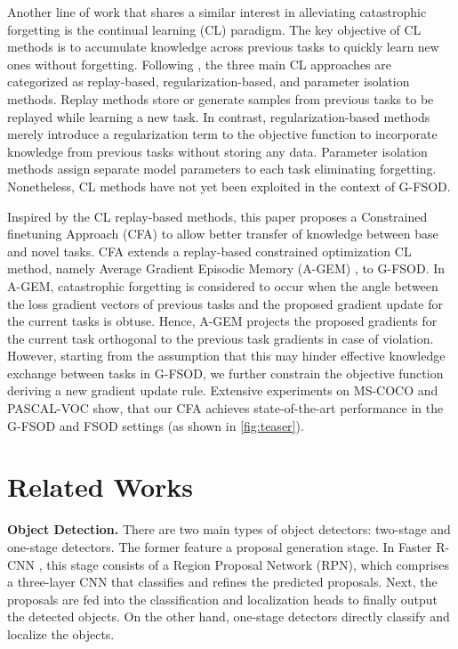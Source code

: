 \documentclass[10pt,twocolumn,letterpaper]{article}
\begin{document}
Another line of work that shares a similar interest in alleviating catastrophic forgetting is the continual learning (CL) paradigm.  The key objective of CL methods is to accumulate knowledge across previous tasks to quickly learn new ones without forgetting. Following \cite{cl_survey}, the three main CL approaches are categorized as replay-based, regularization-based, and parameter isolation methods. Replay methods \cite{iCarl, dgr, er, ser, tem, cope, pr, cclugm, lgm, gem, agem, MER, gss} store or generate samples from previous tasks to be replayed while learning a new task. In contrast, regularization-based methods \cite{ewc, lwf, si, lfl, ebll, dmc} merely introduce a regularization term to the objective function to incorporate knowledge from previous tasks without storing any data. Parameter isolation methods \cite{packnet, pnn, piggyback, hat, expert_gate, rcl, dan} assign separate model parameters to each task eliminating forgetting. Nonetheless, CL methods have not yet been exploited in the context of G-FSOD. 

Inspired by the CL replay-based methods, this paper proposes a Constrained finetuning Approach (CFA) to allow better transfer of knowledge between base and novel tasks. CFA extends a replay-based constrained optimization CL method, namely Average Gradient Episodic Memory (A-GEM) \cite{agem}, to G-FSOD. In A-GEM, catastrophic forgetting is considered to occur when the angle between the loss gradient vectors of previous tasks and the proposed gradient update for the current tasks is obtuse. Hence,  A-GEM projects the proposed gradients for the current task orthogonal to the previous task gradients in case of violation. However, starting from the assumption that this may hinder effective knowledge exchange between tasks in G-FSOD, we further constrain the objective function deriving a new gradient update rule. Extensive experiments on MS-COCO and PASCAL-VOC show, that our CFA achieves state-of-the-art performance in the G-FSOD and FSOD settings (as shown in \cref{fig:teaser}).

\section{Related Works}
\label{sec:related_works}
\textbf{Object Detection.} There are two main types of object detectors: two-stage and one-stage detectors. The former \cite{R-CNN, FastR-CNN, FasterR-CNN} feature a proposal generation stage. In Faster R-CNN \cite{FasterR-CNN}, this stage consists of a Region Proposal Network (RPN), which comprises a three-layer CNN that classifies and refines the predicted proposals. Next, the proposals are fed into the classification and localization heads to finally output the detected objects. On the other hand, one-stage detectors \cite{SSD, YOLOv1, YOLOv2, EfficientDet}  directly classify and localize the objects.
\end{document}
